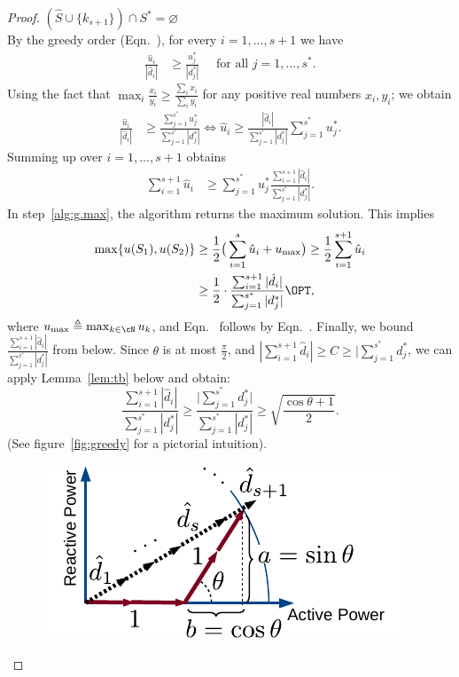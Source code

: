 \begin{proof}
 $(\hat S \cup \{k_{s+1}\}) \cap S^* = \varnothing$\\
  By the greedy order (Eqn.~), for every $i=1,...,s+1$ we have
 \begin{align}
 \frac{\hat u_i}{|\hat d_i|} &\ge \frac{u^*_j}{|d^*_j|} \quad \text{ for all } j = 1,...,s^*.
 \end{align}
 Using the fact that $\max_i \frac{x_i}{y_i} \ge \frac{\sum_i x_i}{\sum_i y_i}$ for any positive real numbers  $x_i,y_i$; we obtain
 \begin{align}
\frac{ \hat u_i } {|\hat d_i|}&\ge \frac{\sum_{j=1}^{s^*} u^*_j}{\sum_{j = 1}^{s^*} |d^*_j|} \iff \hat u_i  \ge \frac{|\hat d_i|}{\sum_{j = 1}^{s^*} |d^*_j|} {\sum_{j=1}^{s^*} u^*_j}.
 \end{align}
 Summing up over $i=1,...,s+1$ obtains
 \begin{align}
     \sum_{i=1}^{s+1} \hat u_i &\ge {\sum_{j=1}^{s^*} u^*_j} \frac{ \sum_{i=1}^{s+1}|\hat d_i|} {\sum_{j = 1}^{s^*} |d^*_j|}. \label{eq:g.1}
 \end{align}
 In step~\ref{alg:g.max}, the algorithm returns the maximum solution. This implies
 \begin{align}
 \max\{u(S_1), u(S_2)\} &\ge \frac{1}{2} \big( \sum_{i=1}^{s} \hat u_i + u_{\max}\big) \ge \frac{1}{2} \sum_{i=1}^{s+1} \hat u_i \nonumber\\
 & \ge \frac{1}{2}\cdot \frac{ \sum_{i=1}^{s+1}|\hat d_i|} {\sum_{j = 1}^{s^*} |d^*_j|} \OPT, \label{eq:g.2}
 \end{align}
 where $u_{\max} \triangleq \max_{k\in \cN} u_k$, and Eqn.~ follows by Eqn.~. Finally, we bound $\frac{ \sum_{i=1}^{s+1}|\hat d_i|} {\sum_{j = 1}^{s^*} |d^*_j|}$ from below.  Since $\theta$ is at most $\frac{\pi}{2}$, and $|\sum_{i=1}^{s+1} \hat d_i | \ge C \ge |\sum_{j=1}^{s^*}  d^*_j$, we can apply Lemma~\ref{lem:tb} below and obtain: 
\begin{equation} 
\frac{ \sum_{i=1}^{s+1}|\hat d_i|} {\sum_{j = 1}^{s^*} |d^*_j|} \ge \frac{\big|\sum_{j=1}^{s^*} d^*_j \big|}{\sum_{j = 1}^{s^*} |d^*_j|}\ge \sqrt{\frac{\cos \theta + 1}{2}}. \label{eq:g.3}
 \end{equation}
 (See figure~\ref{fig:greedy} for a pictorial intuition).
\begin{figure}[!ht]
	\begin{center}
		\includegraphics[scale=0.8]{fig/fig-greedy.pdf}

\end{center}
\end{figure}
\end{proof}
